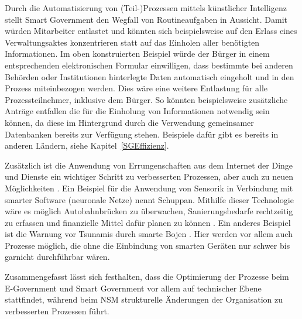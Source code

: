 Durch die Automatisierung von (Teil-)Prozessen mittels künstlicher Intelligenz stellt Smart Government den Wegfall von Routineaufgaben in Aussicht.
Damit würden Mitarbeiter entlastet und könnten sich beispielsweise auf den Erlass eines Verwaltungsaktes konzentrieren statt auf das Einholen aller benötigten Informationen.
Im oben konstruierten Beispiel würde der Bürger in einem entsprechenden elektronischen Formular einwilligen, dass bestimmte bei anderen Behörden oder Institutionen hinterlegte Daten automatisch eingeholt und in den Prozess miteinbezogen werden.
Dies wäre eine weitere Entlastung für alle Prozessteilnehmer, inklusive dem Bürger.
So könnten beispielsweise zusätzliche Anträge entfallen die für die Einholung von Informationen notwendig sein können, da diese im Hintergrund durch die Verwendung gemeinsamer Datenbanken bereits zur Verfügung stehen.
Beispiele dafür gibt es bereits in anderen Ländern, siehe Kapitel~\ref{SGEffizienz}.

Zusätzlich ist die Anwendung von Errungenschaften aus dem Internet der Dinge und Dienste ein wichtiger Schritt zu verbesserten Prozessen, aber auch zu neuen Möglichkeiten \citep[][]{Lucke2016}.  
Ein Beispiel für die Anwendung von Sensorik in Verbindung mit smarter Software (neuronale Netze) nennt Schuppan.
Mithilfe dieser Technologie wäre es möglich Autobahnbrücken zu überwachen, Sanierungsbedarfe rechtzeitig zu erfassen und finanzielle Mittel dafür planen zu können \citep[][]{Schuppan2016}.
Ein anderes Beispiel ist die Warnung vor Tsunamis durch smarte Bojen \citep[][]{Lucke2016}.
Hier werden vor allem auch Prozesse möglich, die ohne die Einbindung von smarten Geräten nur schwer bis garnicht durchführbar wären.

Zusammengefasst lässt sich festhalten, dass die Optimierung der Prozesse beim E-Government und Smart Government vor allem auf technischer Ebene stattfindet, während beim NSM strukturelle Änderungen der Organisation zu verbesserten Prozessen führt.

